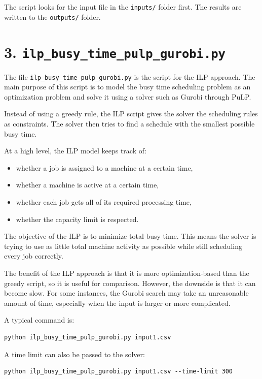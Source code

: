 \documentclass[12pt]{article}
\begin{document}
The script looks for the input file in the \texttt{inputs/} folder first. The
results are written to the \texttt{outputs/} folder.

\section*{3. \texttt{ilp\_busy\_time\_pulp\_gurobi.py}}

The file \texttt{ilp\_busy\_time\_pulp\_gurobi.py} is the script for the ILP
approach. The main purpose of this script is to model the busy time scheduling
problem as an optimization problem and solve it using a solver such as Gurobi
through PuLP.

Instead of using a greedy rule, the ILP script gives the solver the scheduling
rules as constraints. The solver then tries to find a schedule with the smallest
possible busy time.

At a high level, the ILP model keeps track of:

\begin{itemize}[leftmargin=*]
    \item whether a job is assigned to a machine at a certain time,
    \item whether a machine is active at a certain time,
    \item whether each job gets all of its required processing time,
    \item whether the capacity limit is respected.
\end{itemize}

The objective of the ILP is to minimize total busy time. This means the solver is
trying to use as little total machine activity as possible while still scheduling
every job correctly.

The benefit of the ILP approach is that it is more optimization-based than the
greedy script, so it is useful for comparison. However, the downside is that it
can become slow. For some instances, the Gurobi search may take an unreasonable
amount of time, especially when the input is larger or more complicated.

A typical command is:

\begin{verbatim}
python ilp_busy_time_pulp_gurobi.py input1.csv
\end{verbatim}

A time limit can also be passed to the solver:

\begin{verbatim}
python ilp_busy_time_pulp_gurobi.py input1.csv --time-limit 300
\end{verbatim}
\end{document}
